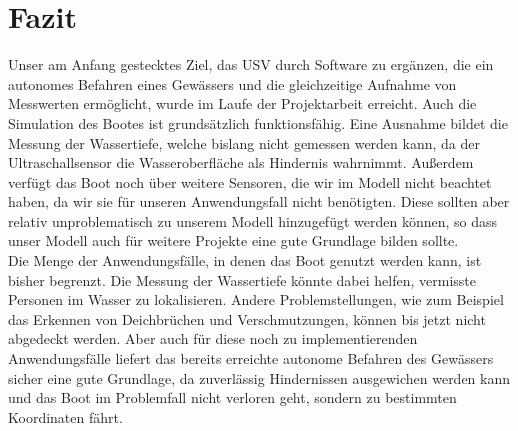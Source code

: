 \documentclass[11pt]{article}
\begin{document}
\section{Fazit} \label{fazit}
Unser am Anfang gestecktes Ziel, das USV durch Software zu ergänzen, die ein autonomes Befahren eines Gewässers und die gleichzeitige Aufnahme von Messwerten ermöglicht, wurde im Laufe der Projektarbeit erreicht. Auch die Simulation des Bootes ist grundsätzlich funktionsfähig. Eine Ausnahme bildet die Messung der Wassertiefe, welche bislang nicht gemessen werden kann, da der Ultraschallsensor die Wasseroberfläche als Hindernis wahrnimmt. Außerdem verfügt das Boot noch über weitere Sensoren, die wir im Modell nicht beachtet haben, da wir sie für unseren Anwendungsfall nicht benötigten. Diese sollten aber relativ unproblematisch zu unserem Modell hinzugefügt werden können, so dass unser Modell auch für weitere Projekte eine gute Grundlage bilden sollte.\\
Die Menge der Anwendungsfälle, in denen das Boot genutzt werden kann, ist bisher begrenzt. Die Messung der Wassertiefe könnte dabei helfen, vermisste Personen im Wasser zu lokalisieren. Andere Problemstellungen, wie zum Beispiel das Erkennen von Deichbrüchen und Verschmutzungen, können bis jetzt nicht abgedeckt werden. Aber auch für diese noch zu implementierenden Anwendungsfälle liefert das bereits erreichte autonome Befahren des Gewässers sicher eine gute Grundlage, da zuverlässig Hindernissen ausgewichen werden kann und das Boot im Problemfall nicht verloren geht, sondern zu bestimmten Koordinaten fährt.

{}

\end{document}
